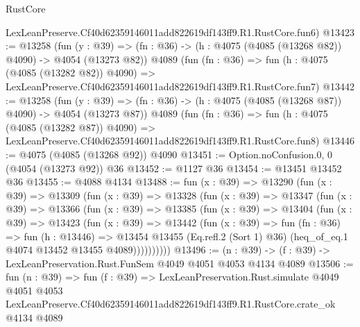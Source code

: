 \begin{lexlean}{RustCore}
\begin{coremodule}
    LexLeanPreserve.Cf40d62359146011add822619df143ff9.R1.RustCore.fun6)
@13423 := @13258
    (fun (y : @39) => (fn : @36) -> (h : @4075 (@4085 (@13268 @82)) @4090) -> @4054 (@13273 @82))
    @4089
    (fun (fn : @36) =>
    fun (h : @4075 (@4085 (@13282 @82)) @4090) =>
    LexLeanPreserve.Cf40d62359146011add822619df143ff9.R1.RustCore.fun7)
@13442 := @13258
    (fun (y : @39) => (fn : @36) -> (h : @4075 (@4085 (@13268 @87)) @4090) -> @4054 (@13273 @87))
    @4089
    (fun (fn : @36) =>
    fun (h : @4075 (@4085 (@13282 @87)) @4090) =>
    LexLeanPreserve.Cf40d62359146011add822619df143ff9.R1.RustCore.fun8)
@13446 := @4075 (@4085 (@13268 @92)) @4090
@13451 := Option.noConfusion.{0, 0} (@4054 (@13273 @92)) @36
@13452 := @1127 @36
@13454 := @13451 @13452 @36
@13455 := @4088 @4134
@13488 := fun (x : @39) =>
  @13290
    (fun (x : @39) =>
    @13309
      (fun (x : @39) =>
      @13328
        (fun (x : @39) =>
        @13347
          (fun (x : @39) =>
          @13366
            (fun (x : @39) =>
            @13385
              (fun (x : @39) =>
              @13404
                (fun (x : @39) =>
                @13423
                  (fun (x : @39) =>
                  @13442
                    (fun (x : @39) =>
                    fun (fn : @36) =>
                    fun (h : @13446) =>
                    @13454
                      @13455
                      (Eq.refl.{2} (Sort 1) @36)
                      (heq_of_eq.{1} @4074 @13452 @13455 @4089))))))))))
@13496 := (n : @39) -> (f : @39) -> LexLeanPreservation.Rust.FunSem @4049 @4051 @4053 @4134 @4089
@13506 := fun (n : @39) =>
  fun (f : @39) =>
  LexLeanPreservation.Rust.simulate
    @4049
    @4051
    @4053
    LexLeanPreserve.Cf40d62359146011add822619df143ff9.R1.RustCore.crate_ok
    @4134
    @4089
\end{coremodule}
\end{lexlean}

